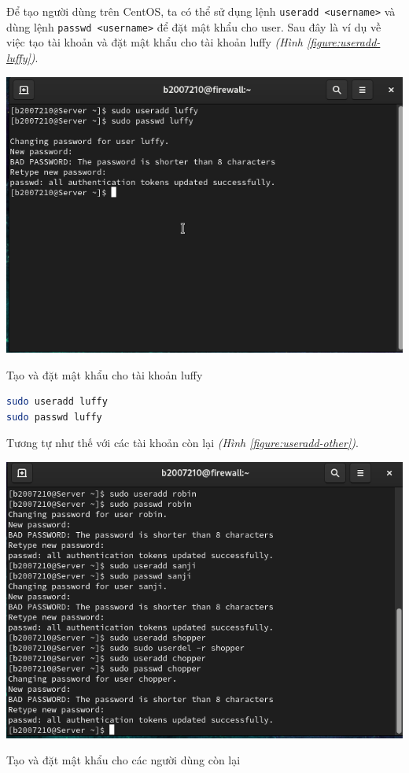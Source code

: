 \documentclass[a4paper, 11pt]{article}
\begin{document}
Để tạo người dùng trên CentOS, ta có thể sử dụng lệnh \texttt{useradd <username>} và dùng lệnh \texttt{passwd <username>} để đặt mật khẩu cho user.
Sau đây là ví dụ về việc tạo tài khoản và đặt mật khẩu cho tài khoản luffy \textit{(Hình \ref{figure:useradd-luffy})}.

\begin{minipage}
    {\linewidth}
    \captionsetup{type=figure}
    \centering
    \includegraphics[width=\linewidth]{images/useradd-luffy.png}
    \caption{Tạo và đặt mật khẩu cho tài khoản luffy}
    \label{figure:useradd-luffy}
\end{minipage}

\begin{lstlisting}[language=bash, caption=Tạo và đặt mật khẩu cho tài khoản luffy]
sudo useradd luffy
sudo passwd luffy
\end{lstlisting}

Tương tự như thế với các tài khoản còn lại \textit{(Hình \ref{figure:useradd-other})}.

\begin{minipage}
    {\linewidth}
    \captionsetup{type=figure}
    \centering
    \includegraphics[width=\linewidth]{images/useradd-other.png}
    \caption{Tạo và đặt mật khẩu cho các người dùng còn lại}
    \label{figure:useradd-other}
\end{minipage}
\end{document}
